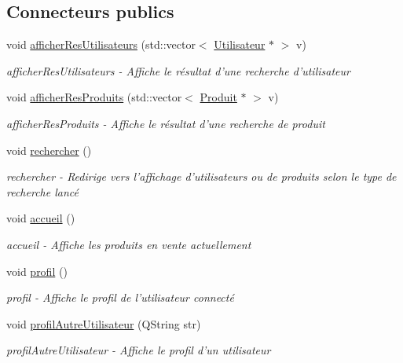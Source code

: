 \subsection*{Connecteurs publics}
\begin{DoxyCompactItemize}
\item 
void \hyperlink{class_ma_fenetre_a4c4a8f4b2f7a79839e2c2250f4835166}{afficher\-Res\-Utilisateurs} (std\-::vector$<$ \hyperlink{class_utilisateur}{Utilisateur} $\ast$ $>$ v)
\begin{DoxyCompactList}\small\item\em afficher\-Res\-Utilisateurs -\/ Affiche le résultat d'une recherche d'utilisateur \end{DoxyCompactList}\item 
void \hyperlink{class_ma_fenetre_a115348adbe409a24a0d381e1fcc62fe7}{afficher\-Res\-Produits} (std\-::vector$<$ \hyperlink{class_produit}{Produit} $\ast$ $>$ v)
\begin{DoxyCompactList}\small\item\em afficher\-Res\-Produits -\/ Affiche le résultat d'une recherche de produit \end{DoxyCompactList}\item 
void \hyperlink{class_ma_fenetre_a8107c2666807db431962fdcd4e942c69}{rechercher} ()
\begin{DoxyCompactList}\small\item\em rechercher -\/ Redirige vers l'affichage d'utilisateurs ou de produits selon le type de recherche lancé \end{DoxyCompactList}\item 
void \hyperlink{class_ma_fenetre_abc0a097122f161ced271718b254206cd}{accueil} ()
\begin{DoxyCompactList}\small\item\em accueil -\/ Affiche les produits en vente actuellement \end{DoxyCompactList}\item 
void \hyperlink{class_ma_fenetre_a08a81ac61e783cf5ed3855ca4f18c84e}{profil} ()
\begin{DoxyCompactList}\small\item\em profil -\/ Affiche le profil de l'utilisateur connecté \end{DoxyCompactList}\item 
void \hyperlink{class_ma_fenetre_a91caf819bc0ddee1c27a35b131049259}{profil\-Autre\-Utilisateur} (Q\-String str)
\begin{DoxyCompactList}\small\item\em profil\-Autre\-Utilisateur -\/ Affiche le profil d'un utilisateur \end{DoxyCompactList}\item 

\end{DoxyCompactItemize}
